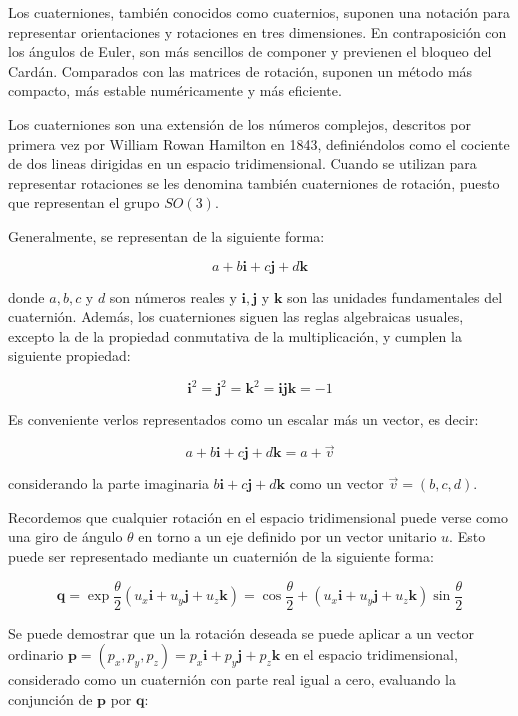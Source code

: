 Los cuaterniones, también conocidos como cuaternios, suponen una notación para
representar orientaciones y rotaciones en tres dimensiones. En contraposición
con los ángulos de Euler, son más sencillos de componer y previenen el bloqueo
del Cardán. Comparados con las matrices de rotación, suponen un método más
compacto, más estable numéricamente y más eficiente. 

Los cuaterniones son una extensión de los números complejos, descritos por
primera vez por William Rowan Hamilton en 1843, definiéndolos como el cociente
de dos lineas dirigidas en un espacio tridimensional.  Cuando se utilizan para
representar rotaciones se les denomina también cuaterniones de rotación, puesto
que representan el grupo $SO(3)$. 

Generalmente, se representan de la siguiente forma:

\[a + b\boldsymbol{i} + c\boldsymbol{j} + d\boldsymbol{k} \] 

donde $a,b,c$ y $d$ son números reales y $\boldsymbol{i}, \boldsymbol{j}$ y
$\boldsymbol{k}$ son las unidades fundamentales del cuaternión. Además, los
cuaterniones  siguen las reglas algebraicas usuales, excepto la de la propiedad
conmutativa de la multiplicación, y cumplen la siguiente propiedad:

\[\boldsymbol{i}^2 = \boldsymbol{j}^2 = \boldsymbol{k}^2 = \boldsymbol{ijk} = -1 \]

Es conveniente verlos representados como un escalar más un vector, es decir:

\[a + b\boldsymbol{i} + c\boldsymbol{j} + d\boldsymbol{k} = a +
\overrightarrow{v} \] 

considerando la parte imaginaria $b\boldsymbol{i} + c\boldsymbol{j} +
d\boldsymbol{k}$ como un vector $\overrightarrow{v} = (b,c,d)$. 

Recordemos que cualquier rotación en el espacio tridimensional puede verse como
una giro de ángulo $\theta$ en torno a un eje definido por un vector unitario
$u$. Esto puede ser representado mediante un cuaternión de la siguiente forma:

\[\boldsymbol{q} = \exp{\frac{\theta}{2}(u_x\boldsymbol{i} + u_y\boldsymbol{j} +
		u_z\boldsymbol{k})} = \cos{\frac{\theta}{2}} + (u_x\boldsymbol{i} + 
u_y\boldsymbol{j} + u_z\boldsymbol{k})\sin{\frac{\theta}{2}} \]

Se puede demostrar que un la rotación deseada se puede aplicar a un vector
ordinario $\boldsymbol{p} = (p_x, p_y, p_z) = p_x\boldsymbol{i} +
p_y\boldsymbol{j} + p_z\boldsymbol{k}$ en el espacio tridimensional, considerado
como un cuaternión con parte real igual a cero, evaluando la conjunción de
$\boldsymbol{p}$ por $\boldsymbol{q}$:

